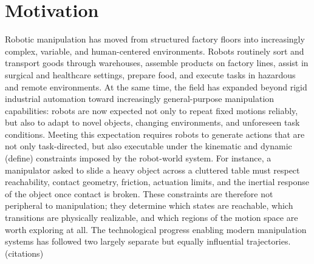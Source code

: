 \section{Motivation}
\label{sec:intro:landscape}

Robotic manipulation has moved from structured factory floors into increasingly complex, variable, and human-centered environments.
Robots routinely sort and transport goods through warehouses, assemble products on factory lines, assist in surgical and healthcare settings, prepare food, and execute tasks in hazardous and remote environments.
At the same time, the field has expanded beyond rigid industrial automation toward increasingly general-purpose manipulation capabilities: robots are now expected not only to repeat fixed motions reliably, but also to adapt to novel objects, changing environments, and unforeseen task conditions.
Meeting this expectation requires robots to generate actions that are not only task-directed, but also executable under the kinematic and dynamic (define) constraints imposed by the robot-world system.
For instance, a manipulator asked to slide a heavy object across a cluttered table must respect reachability, contact geometry, friction, actuation limits, and the inertial response of the object once contact is broken.
These constraints are therefore not peripheral to manipulation; they determine which states are reachable, which transitions are physically realizable, and which regions of the motion space are worth exploring at all.
The technological progress enabling modern manipulation systems has followed two largely separate but equally influential trajectories.
(citations)


